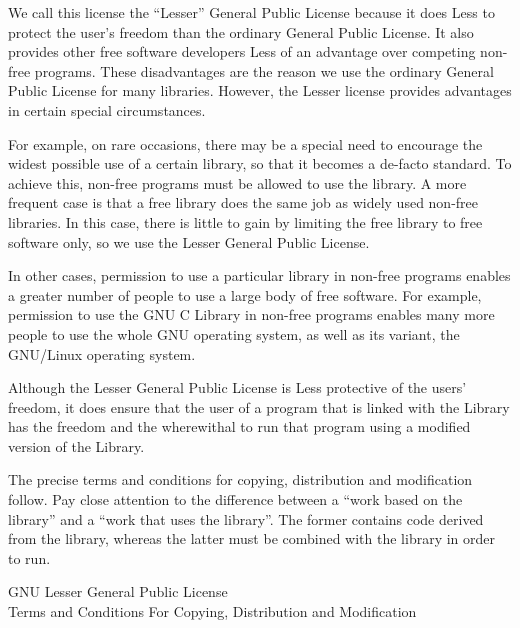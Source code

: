\documentclass[12pt]{report}
\begin{document}
We call this license the ``Lesser'' General Public License because it does
Less to protect the user's freedom than the ordinary General Public
License.  It also provides other free software developers Less of an
advantage over competing non-free programs.  These disadvantages are the
reason we use the ordinary General Public License for many libraries.
However, the Lesser license provides advantages in certain special
circumstances.

For example, on rare occasions, there may be a special need to encourage
the widest possible use of a certain library, so that it becomes a
de-facto standard.  To achieve this, non-free programs must be allowed to
use the library.  A more frequent case is that a free library does the
same job as widely used non-free libraries.  In this case, there is little
to gain by limiting the free library to free software only, so we use the
Lesser General Public License.

In other cases, permission to use a particular library in non-free
programs enables a greater number of people to use a large body of free
software.  For example, permission to use the GNU C Library in non-free
programs enables many more people to use the whole GNU operating system,
as well as its variant, the GNU/Linux operating system.

Although the Lesser General Public License is Less protective of the
users' freedom, it does ensure that the user of a program that is linked
with the Library has the freedom and the wherewithal to run that program
using a modified version of the Library.

The precise terms and conditions for copying, distribution and
modification follow.  Pay close attention to the difference between a
``work based on the library'' and a ``work that uses the library''.  The
former contains code derived from the library, whereas the latter must be
combined with the library in order to run.

\begin{center}
{\Large \sc GNU Lesser General Public License} \\
{\Large \sc Terms and Conditions For Copying, Distribution and
  Modification}
\end{center}
\end{document}
